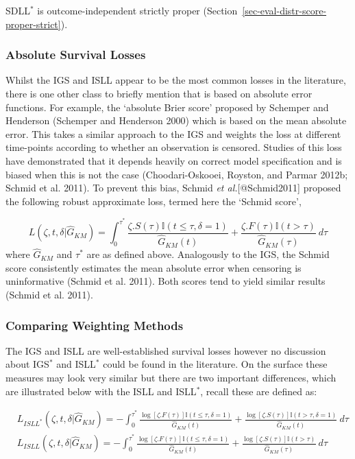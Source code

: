 \documentclass[
  letterpaper,
]{scrbook}
\theoremstyle{plain}
\theoremstyle{definition}
\theoremstyle{remark}
\begin{document}
SDLL\(^*\) is outcome-independent strictly proper
(Section~\ref{sec-eval-distr-score-proper-strict}).

\hypertarget{absolute-survival-losses}{%
\subsubsection{Absolute Survival
Losses}\label{absolute-survival-losses}}

Whilst the IGS and ISLL appear to be the most common losses in the
literature, there is one other class to briefly mention that is based on
absolute error functions. For example, the `absolute Brier score'
proposed by Schemper and Henderson (Schemper and Henderson 2000) which
is based on the mean absolute error. This takes a similar approach to
the IGS and weights the loss at different time-points according to
whether an observation is censored. Studies of this loss have
demonstrated that it depends heavily on correct model specification and
is biased when this is not the case (Choodari-Oskooei, Royston, and
Parmar 2012b; Schmid et al. 2011). To prevent this bias, Schmid
\textit{et al.}[@Schmid2011] proposed the following robust approximate
loss, termed here the `Schmid score',

\[
L(\zeta, t, \delta|\hat{G}_{KM}) = \int^{\tau^*}_0 \frac{\zeta.S(\tau)\mathbb{I}(t \leq \tau, \delta = 1)}{\hat{G}_{KM}(t)} + \frac{\zeta.F(\tau)\mathbb{I}(t > \tau)}{\hat{G}_{KM}(\tau)} \ d\tau
\] where \(\hat{G}_{KM}\) and \(\tau^*\) are as defined above.
Analogously to the IGS, the Schmid score consistently estimates the mean
absolute error when censoring is uninformative (Schmid et al. 2011).
Both scores tend to yield similar results (Schmid et al. 2011).

\hypertarget{comparing-weighting-methods}{%
\subsubsection{Comparing Weighting
Methods}\label{comparing-weighting-methods}}

The IGS and ISLL are well-established survival losses however no
discussion about IGS\(^*\) and ISLL\(^*\) could be found in the
literature. On the surface these measures may look very similar but
there are two important differences, which are illustrated below with
the ISLL and ISLL\(^*\), recall these are defined as:

\[
\begin{split}
&L_{ISLL^*}(\zeta, t, \delta|\hat{G}_{KM}) = -\int^{\tau^*}_0  \frac{\log[\zeta.F(\tau)]\mathbb{I}(t \leq \tau, \delta = 1)}{\hat{G}_{KM}(t)} + \frac{\log[\zeta.S(\tau)]\mathbb{I}(t > \tau, \delta = 1)}{\hat{G}_{KM}(t)} \ d\tau \\
&L_{ISLL}(\zeta,t,\delta|\hat{G}_{KM}) = -\int^{\tau^*}_0  \frac{\log[\zeta.F(\tau)] \mathbb{I}(t \leq \tau, \delta=1)}{\hat{G}_{KM}(t)} + \frac{\log[\zeta.S(\tau)] \mathbb{I}(t > \tau)}{\hat{G}_{KM}(\tau)} \ d\tau
\end{split}
\]
\end{document}
